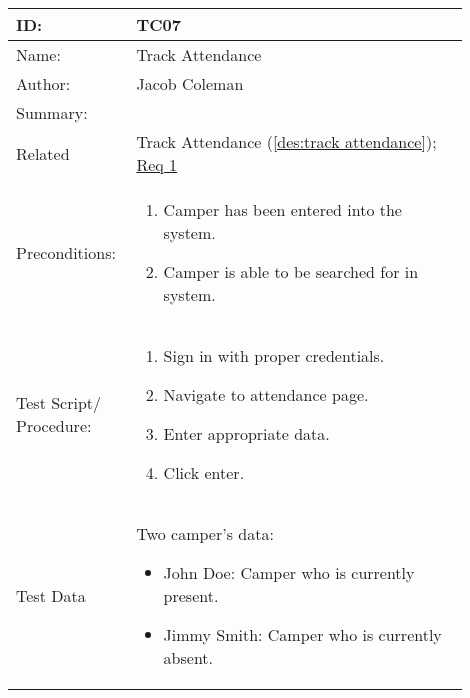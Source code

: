 \documentclass[11pt]{article}
\begin{document}
\begin{table}[H]
\begin{center}
\begin{tabular}{p{0.20\linewidth}p{0.70\linewidth}}
	ID: & TC07\\\hline
	Name: & Track Attendance \\\hline
	Author: & Jacob Coleman\\\hline
	Summary: &  \\\hline
	Related \hspace{5em} & Track Attendance (\cref{des:track attendance}); \hyperlink{Req1}{Req 1}\\\hline
	Preconditions:& \begin{enumerate}[topsep=0pt] 
		\item Camper has been entered into the system.
		\item Camper is able to be searched for in system.
	\end{enumerate}\\\hline
	Test Script/ Procedure: & \begin{enumerate}[topsep=0pt]
		\item Sign in with proper credentials.
		\item Navigate to attendance page.
		\item Enter appropriate data.
		\item Click enter.
	\end{enumerate}\\\hline
	Test Data & \vspace*{.25em} Two camper's data:
	\begin{itemize}[topsep=0pt]
		\item John Doe: Camper who is currently present.
		\item Jimmy Smith: Camper who is currently absent.
	\end{itemize}
\end{tabular}
\label{TC07}	
\end{center}
\end{table}
\end{document}
